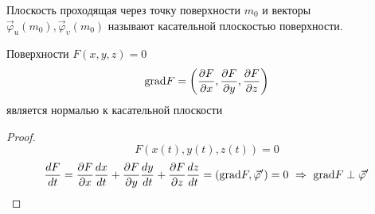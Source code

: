 \begin{define}
  Плоскость проходящая через точку поверхности $m_0$ и векторы
  $\vec \varphi_u (m_0), \vec \varphi_{\upsilon}(m_0)$ называют касательной
  плоскостью поверхности.
\end{define}

\begin{theorem}
  Поверхности $F(x,y,z) = 0$
  $$
  \mathrm{grad} F = \left( \frac{\partial F}{\partial x},
  \frac{\partial F}{\partial y},
  \frac{\partial F}{\partial z}
   \right)
  $$
  является нормалью к касательной плоскости
\end{theorem}

\begin{proof}
  $$
  F(x(t), y(t), z(t)) = 0
  $$
  $$
  \frac{dF}{dt} =
  \frac{\partial F}{\partial x} \frac{dx}{dt} +
  \frac{\partial F}{\partial y}\frac{dy}{dt} +
  \frac{\partial F}{\partial z}\frac{dz}{dt} =
  (\mathrm{grad} F, \vec \varphi') = 0 ~ \Rightarrow ~ \mathrm{grad} F \perp \vec \varphi'
  $$
\end{proof}
